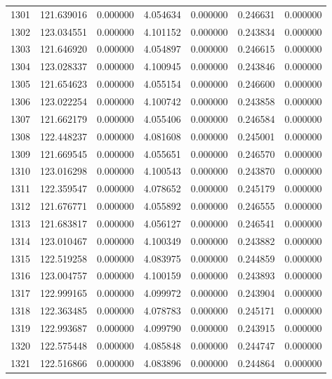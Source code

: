 \begin{tabular}{rrrrrrr}
1301 & 121.639016 &    0.000000 &  4.054634 &    0.000000 &    0.246631 &  0.000000 \\
1302 & 123.034551 &    0.000000 &  4.101152 &    0.000000 &    0.243834 &  0.000000 \\
1303 & 121.646920 &    0.000000 &  4.054897 &    0.000000 &    0.246615 &  0.000000 \\
1304 & 123.028337 &    0.000000 &  4.100945 &    0.000000 &    0.243846 &  0.000000 \\
1305 & 121.654623 &    0.000000 &  4.055154 &    0.000000 &    0.246600 &  0.000000 \\
1306 & 123.022254 &    0.000000 &  4.100742 &    0.000000 &    0.243858 &  0.000000 \\
1307 & 121.662179 &    0.000000 &  4.055406 &    0.000000 &    0.246584 &  0.000000 \\
1308 & 122.448237 &    0.000000 &  4.081608 &    0.000000 &    0.245001 &  0.000000 \\
1309 & 121.669545 &    0.000000 &  4.055651 &    0.000000 &    0.246570 &  0.000000 \\
1310 & 123.016298 &    0.000000 &  4.100543 &    0.000000 &    0.243870 &  0.000000 \\
1311 & 122.359547 &    0.000000 &  4.078652 &    0.000000 &    0.245179 &  0.000000 \\
1312 & 121.676771 &    0.000000 &  4.055892 &    0.000000 &    0.246555 &  0.000000 \\
1313 & 121.683817 &    0.000000 &  4.056127 &    0.000000 &    0.246541 &  0.000000 \\
1314 & 123.010467 &    0.000000 &  4.100349 &    0.000000 &    0.243882 &  0.000000 \\
1315 & 122.519258 &    0.000000 &  4.083975 &    0.000000 &    0.244859 &  0.000000 \\
1316 & 123.004757 &    0.000000 &  4.100159 &    0.000000 &    0.243893 &  0.000000 \\
1317 & 122.999165 &    0.000000 &  4.099972 &    0.000000 &    0.243904 &  0.000000 \\
1318 & 122.363485 &    0.000000 &  4.078783 &    0.000000 &    0.245171 &  0.000000 \\
1319 & 122.993687 &    0.000000 &  4.099790 &    0.000000 &    0.243915 &  0.000000 \\
1320 & 122.575448 &    0.000000 &  4.085848 &    0.000000 &    0.244747 &  0.000000 \\
1321 & 122.516866 &    0.000000 &  4.083896 &    0.000000 &    0.244864 &  0.000000 \\

\end{tabular}
